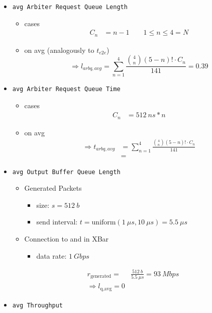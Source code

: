 \documentclass[]{scrartcl}
\begin{document}
\begin{itemize}
\begin{itemize}
            \end{itemize}
        \item \verb|avg Arbiter Request Queue Length|
            \begin{itemize}
                \item cases
                    \begin{align}
                        C_n &= n-1 \qquad 1\leq n\leq4=N
                    \end{align}
                \item on avg (analogously to $t_{e2e}$)
                    \begin{equation}
                        \Rightarrow l_{arbq,avg} = \sum_{n=1}^4 \frac{\binom{4}{n}\left( 5-n \right)! \cdot C_n }{141} = 0.39
                    \end{equation}
            \end{itemize}
        \item \verb|avg Arbiter Request Queue Time|
            \begin{itemize}
                \item cases
                    \begin{align}
                        C_n &= \SI{512}{ns} * n
                    \end{align}
                \item on avg
                    \begin{align}
                        \Rightarrow t_{arbq,avg} &= \sum_{n=1}^4 \frac{\binom{4}{n}\left( 5-n \right)! \cdot C_n }{141}\\
                                                 &=
                    \end{align}
            \end{itemize}
        \item \verb|avg Output Buffer Queue Length|
            \begin{itemize}
                \item Generated Packets
                    \begin{itemize}
                        \item size: $ s = \SI{512}{b}$
                        \item send interval: $ t = \text{uniform}(\SI{1}{\mu s}, \SI{10}{\mu s}) = \SI{5.5}{\mu s}$
                    \end{itemize}
                \item Connection to and in XBar
                    \begin{itemize}
                        \item data rate: $\SI{1}{Gbps}$
                    \end{itemize}
            \end{itemize}
            \begin{align}
                r_\text{generated} =& \frac{\SI{512}{b}}{\SI{5.5}{\mu s}} = \SI{93}{Mbps}\\
                \Rightarrow l_\text{q,avg} = 0
            \end{align}
        \item \verb|avg Throughput|


\end{itemize}
\end{document}
